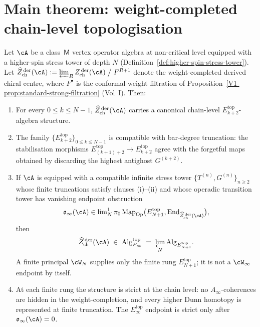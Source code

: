 \section{Main theorem: weight-completed chain-level topologisation}
\label{sec:main-theorem-weight-completed-topologization}

\begin{theorem}
\label{thm:weight-completed-topologization-class-m}
\ClaimStatusProvedHere
Let $\cA$ be a class~$\mathsf{M}$ vertex operator algebra at non-critical
level equipped with a higher-spin stress tower of depth $N$
(Definition~\ref{def:higher-spin-stress-tower}). Let
$\widehat{Z}^{\,\mathrm{der}}_{\mathrm{ch}}(\cA) := \varprojlim_R
Z^{\,\mathrm{der}}_{\mathrm{ch}}(\cA) \bigm/ F^{R+1}$ denote the
weight-completed derived chiral centre, where $F^\bullet$ is the
conformal-weight filtration of
Proposition~\ref{V1-prop:standard-strong-filtration} \textup{(}Vol~I\textup{)}.
Then:
\begin{enumerate}[label=\textup{(}\roman*\textup{)}, nosep]
\item For every $0 \le k \le N - 1$,
$\widehat{Z}^{\,\mathrm{der}}_{\mathrm{ch}}(\cA)$ carries a canonical
chain-level $E_{k+2}^{\mathrm{top}}$-algebra structure.
\item The family $\bigl\{E_{k+2}^{\mathrm{top}}\bigr\}_{0 \le k \le N-1}$
is compatible with bar-degree truncation: the stabilisation morphisms
$E_{(k+1)+2}^{\mathrm{top}} \to E_{k+2}^{\mathrm{top}}$ agree with the
forgetful maps obtained by discarding the highest antighost
$G^{(k+2)}$.
\item If $\cA$ is equipped with a compatible infinite stress tower
$\{T^{(n)},G^{(n)}\}_{n\ge2}$ whose finite truncations satisfy
clauses \textup{(i)}--\textup{(ii)} and whose operadic transition tower
has vanishing endpoint obstruction
\[
 \mathfrak{o}_{\infty}(\cA)
 \in
 \mathrm{lim}^{1}_{N}\,
 \pi_0\operatorname{Map}_{\mathrm{Op}}
 \bigl(E_{N+1}^{\mathrm{top}},
 \operatorname{End}_{\widehat{Z}^{\,\mathrm{der}}_{\mathrm{ch}}(\cA)}\bigr),
\]
then
\[
 \widehat{Z}^{\,\mathrm{der}}_{\mathrm{ch}}(\cA)
 \;\in\;
 \mathrm{Alg}_{E_\infty}^{\mathrm{top}}
 \;=\;
 \varprojlim_N \mathrm{Alg}_{E_{N+1}^{\mathrm{top}}}.
\]
A finite principal $\cW_N$ supplies only the finite rung
$E_{N+1}^{\mathrm{top}}$; it is not a $\cW_\infty$ endpoint by itself.
\item At each finite rung the structure is strict at the chain level:
no $A_\infty$-coherences are hidden in the weight-completion, and every
higher Dunn homotopy is represented at finite truncation. The
$E_\infty^{\mathrm{top}}$ endpoint is strict only after
$\mathfrak{o}_{\infty}(\cA)=0$.
\end{enumerate}
\end{theorem}

